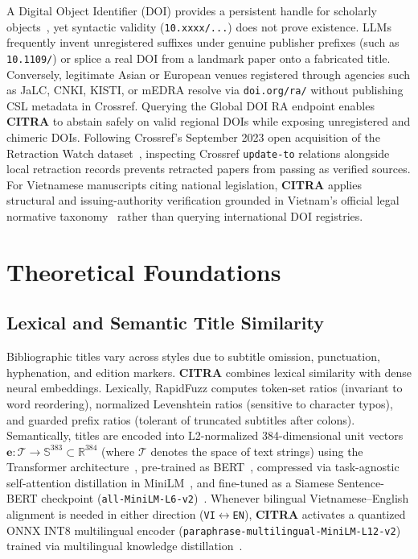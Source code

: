 A Digital Object Identifier (DOI) provides a persistent handle for scholarly objects~\cite{doi-handbook}, yet syntactic validity (\texttt{10.xxxx/...}) does not prove existence. LLMs frequently invent unregistered suffixes under genuine publisher prefixes (such as \texttt{10.1109/}) or splice a real DOI from a landmark paper onto a fabricated title. Conversely, legitimate Asian or European venues registered through agencies such as JaLC, CNKI, KISTI, or mEDRA resolve via \texttt{doi.org/ra/} without publishing CSL metadata in Crossref. Querying the Global DOI RA endpoint enables \textbf{CITRA} to abstain safely on valid regional DOIs while exposing unregistered and chimeric DOIs. Following Crossref's September 2023 open acquisition of the Retraction Watch dataset~\cite{crossref-rw2023}, inspecting Crossref \texttt{update-to} relations alongside local retraction records prevents retracted papers from passing as verified sources. For Vietnamese manuscripts citing national legislation, \textbf{CITRA} applies structural and issuing-authority verification grounded in Vietnam's official legal normative taxonomy~\cite{vbpl-vn} rather than querying international DOI registries.

\section{Theoretical Foundations}

\subsection{Lexical and Semantic Title Similarity}

Bibliographic titles vary across styles due to subtitle omission, punctuation, hyphenation, and edition markers. \textbf{CITRA} combines lexical similarity with dense neural embeddings. Lexically, RapidFuzz computes token-set ratios (invariant to word reordering), normalized Levenshtein ratios (sensitive to character typos), and guarded prefix ratios (tolerant of truncated subtitles after colons). Semantically, titles are encoded into L2-normalized 384-dimensional unit vectors $\mathbf{e}: \mathcal{T} \to \mathbb{S}^{383} \subset \mathbb{R}^{384}$ (where $\mathcal{T}$ denotes the space of text strings) using the Transformer architecture~\cite{vaswani2017}, pre-trained as BERT~\cite{bert}, compressed via task-agnostic self-attention distillation in MiniLM~\cite{wang2020minilm}, and fine-tuned as a Siamese Sentence-BERT checkpoint (\texttt{all-MiniLM-L6-v2})~\cite{reimers2019sbert}. Whenever bilingual Vietnamese--English alignment is needed in either direction (\texttt{VI}$\leftrightarrow$\texttt{EN}), \textbf{CITRA} activates a quantized ONNX INT8 multilingual encoder (\texttt{paraphrase-multilingual-MiniLM-L12-v2}) trained via multilingual knowledge distillation~\cite{reimers2020multilingual}.

